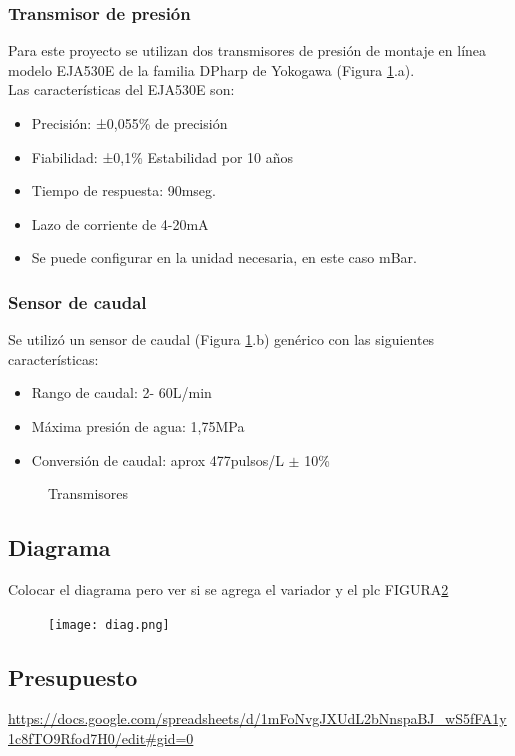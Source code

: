 \subsubsection{Transmisor de presión}
Para este proyecto se utilizan dos transmisores de presión de montaje en línea modelo EJA530E de la familia  DPharp de Yokogawa (Figura \ref{fig:transd}.a).\\
Las características del EJA530E son:
\begin{itemize}
	\item Precisión: ±0,055\% de precisión
	\item Fiabilidad: ±0,1\% Estabilidad por 10 años
	\item Tiempo de respuesta: 90mseg.
	\item Lazo de corriente de 4-20mA
	\item Se puede configurar en la unidad necesaria, en este caso mBar.
\end{itemize}


\subsubsection{Sensor de caudal}
Se utilizó un sensor de caudal (Figura \ref{fig:transd}.b) genérico con las siguientes características:
\begin{itemize}
	\item Rango de caudal: 2- 60L/min
	\item Máxima presión de agua: 1,75MPa
	\item Conversión de caudal: aprox 477pulsos/L $\pm$ 10\%
\end{itemize}


\begin{figure}[htbp]
	\centering
	\caption{Transmisores} \label{fig:transd}
\end{figure}





\subsection{Diagrama}
Colocar el diagrama  pero ver si se agrega el variador y el plc FIGURA\ref{fig:diag}

\begin{figure}[htb]
	\centering
	\texttt{[image: diag.png]}
	\label{fig:diag}
\end{figure}

\subsection{Presupuesto}
\url{https://docs.google.com/spreadsheets/d/1mFoNvgJXUdL2bNnspaBJ_wS5fFA1y1c8fTO9Rfod7H0/edit#gid=0}

\newpage